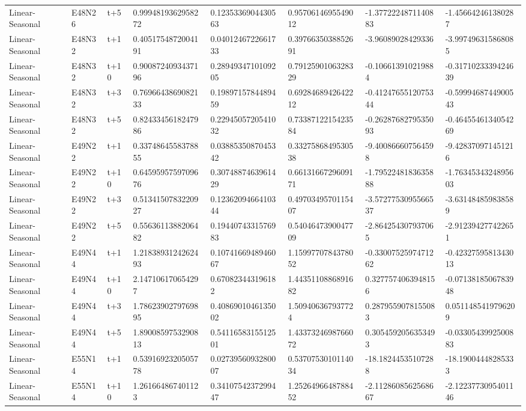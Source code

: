 \begin{landscape}
\begin{longtable}{llllllll}
Linear-Seasonal & E48N26 & t+5 & 0.9994819362958272 & 0.1235336904430563 & 0.9570614695549012 & -1.3772224871140883 & -1.456642461380287 \\
Linear-Seasonal & E48N32 & t+1 & 0.4051754872004191 & 0.0401246722661733 & 0.3976635038852691 & -3.96089028429336 & -3.997496315868085 \\
Linear-Seasonal & E48N32 & t+10 & 0.9008724093437196 & 0.2894934710109205 & 0.7912590106328329 & -0.106613910219884 & -0.3171023339424639 \\
Linear-Seasonal & E48N32 & t+3 & 0.7696643869082133 & 0.1989715784489459 & 0.6928468942642212 & -0.4124765512075344 & -0.5999468744900543 \\
Linear-Seasonal & E48N32 & t+5 & 0.8243345618247986 & 0.2294505720541032 & 0.7338712215423584 & -0.2628768279535093 & -0.4645546134054269 \\
Linear-Seasonal & E49N22 & t+1 & 0.3374864558378855 & 0.0388535087045342 & 0.3327586849530538 & -9.400866607564598 & -9.428370971451216 \\
Linear-Seasonal & E49N22 & t+10 & 0.6459595759709676 & 0.3074887463961429 & 0.6613166729609171 & -1.7952248183635888 & -1.7634534324895603 \\
Linear-Seasonal & E49N22 & t+3 & 0.5134150783220927 & 0.1236209466410344 & 0.4970349570115407 & -3.5727753095566537 & -3.631484859838589 \\
Linear-Seasonal & E49N22 & t+5 & 0.5563611388206482 & 0.1944074331576983 & 0.5404647390047709 & -2.864254307937065 & -2.912394277422651 \\
Linear-Seasonal & E49N44 & t+1 & 1.2183893124262493 & 0.1074166948946067 & 1.1599770784378052 & -0.3300752597471262 & -0.4232759581343013 \\
Linear-Seasonal & E49N44 & t+10 & 2.147106170654297 & 0.670823443196182 & 1.4435110886891682 & 0.3277574063948156 & -0.0713818506783948 \\
Linear-Seasonal & E49N44 & t+3 & 1.7862390279769895 & 0.4086901046135002 & 1.509406367937724 & 0.2879559078155083 & 0.0511485419796209 \\
Linear-Seasonal & E49N44 & t+5 & 1.8900859753290813 & 0.5411658315512501 & 1.4337324698766072 & 0.3054592056353493 & -0.0330543992500883 \\
Linear-Seasonal & E55N14 & t+1 & 0.5391692320505778 & 0.0273956093280007 & 0.5370753010114034 & -18.18244535107288 & -18.19004448285333 \\
Linear-Seasonal & E55N14 & t+10 & 1.261664867401123 & 0.3410754237299447 & 1.2526496648788452 & -2.1128608562568667 & -2.1223773095401146 \\

\end{longtable}
\end{landscape}
